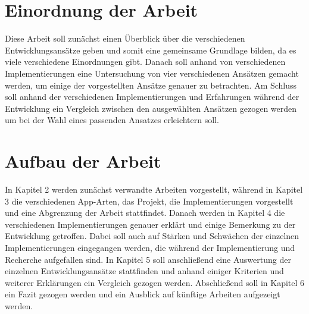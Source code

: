 \section{Einordnung der Arbeit}
Diese Arbeit soll zunächst einen Überblick über die verschiedenen Entwicklungsansätze geben und somit eine gemeinsame Grundlage bilden, da es viele verschiedene Einordnungen gibt.
Danach soll anhand von verschiedenen Implementierungen eine Untersuchung von vier verschiedenen Ansätzen gemacht werden, um einige der vorgestellten Ansätze genauer zu betrachten.
Am Schluss soll anhand der verschiedenen Implementierungen und Erfahrungen während der Entwicklung ein Vergleich zwischen den ausgewählten Ansätzen gezogen werden um bei der Wahl eines passenden Ansatzes erleichtern soll.


\section{Aufbau der Arbeit}
In Kapitel 2 werden zunächst verwandte Arbeiten vorgestellt, während in Kapitel 3 die verschiedenen App-Arten, das Projekt, die Implementierungen vorgestellt und eine Abgrenzung der Arbeit stattfindet.
Danach werden in Kapitel 4 die verschiedenen Implementierungen genauer erklärt und einige Bemerkung zu der Entwicklung getroffen. Dabei soll auch auf Stärken und Schwächen der einzelnen Implementierungen eingegangen werden, die während der Implementierung und Recherche aufgefallen sind.
In Kapitel 5 soll anschließend eine Auswertung der einzelnen Entwicklungsansätze stattfinden und anhand einiger Kriterien und weiterer Erklärungen ein Vergleich gezogen werden. Abschließend soll in Kapitel 6 ein Fazit gezogen werden und ein Ausblick auf künftige Arbeiten aufgezeigt werden.